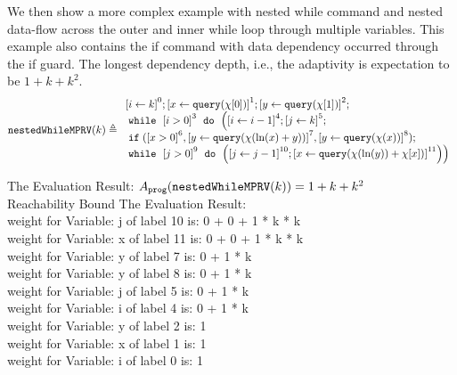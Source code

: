             \begin{example}
   \label{ex:nestedWhileMPRV}
   We then show a more complex example with nested while command and nested data-flow across the outer and inner while loop through multiple variables.
   This example also contains the if command with data dependency occurred through the if guard.
   The longest dependency depth, i.e., the adaptivity is expectation to be $1 + k + k^2 $.
   \[
   \kw{nestedWhileMPRV}(k) \triangleq 
   \begin{array}{l}
\clabel{\assign{i}{k} }^{0} ; 
\clabel{ \assign{x}{\query(\chi[0])}}^{1} ; 
\clabel{ \assign{y}{\query(\chi[1])}}^{2} ; \\
    \ewhile ~ \clabel{i > 0}^{3} ~ \edo ~ 
    \Big(
     \clabel{\assign{i}{i-1}}^{4} ;
     \clabel{\assign{j}{k}}^{5} ;\\
     \eif(\clabel{x > 0}^6, \clabel{\assign{y}{\query(\chi(\ln(x) + y))} }^{7},
     \clabel{\assign{y}{\query(\chi(x))} }^{8} )
      ; \\
     \ewhile ~ \clabel{j > 0}^{9} ~ \edo ~ 
     \Big(
      \clabel{\assign{j}{j-1}}^{10};
      \clabel{\assign{x}{\query(\chi(\ln(y))+\chi[x])} }^{11}
      \Big) \Big)
\end{array}
   \]
   \end{example}
   The Evaluation Result: $ A_{\mathtt{prog}}(\mathtt{nestedWhileMPRV}(k)) = 1 + k + k^2$
   \\
   Reachability Bound The Evaluation Result: \\
            weight for Variable: j of label 10 is: 0 + 0 + 1 * k * k \\
   weight for Variable: x of label 11 is: 0 + 0 + 1 * k * k \\
   weight for Variable: y of label 7 is: 0 + 1 * k \\
   weight for Variable: y of label 8 is: 0 + 1 * k \\
   weight for Variable: j of label 5 is: 0 + 1 * k \\
   weight for Variable: i of label 4 is: 0 + 1 * k \\
   weight for Variable: y of label 2 is: 1 \\
   weight for Variable: x of label 1 is: 1 \\
   weight for Variable: i of label 0 is: 1 \\